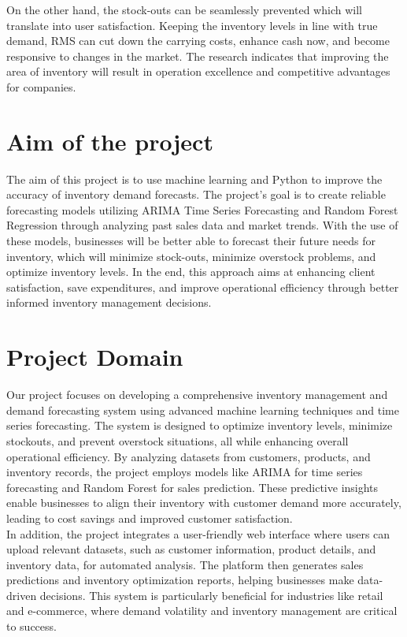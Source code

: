 \documentclass[10pt]{report}
\begin{document}
\begin{center}
\hspace{0.5cm} On the other hand, the stock-outs can be seamlessly prevented which will translate into user satisfaction. Keeping the inventory levels in line with true demand, RMS can cut down the carrying costs, enhance cash now, and become responsive to changes in the market. The research indicates that improving the area of inventory will result in operation excellence and competitive advantages for companies.

\linespread{1.5}
\section{Aim of the project}
\hspace{0.5cm}The aim of this project is to use machine learning and Python to improve the accuracy of inventory demand forecasts. The project's goal is to create reliable forecasting models utilizing ARIMA Time Series Forecasting and Random Forest Regression through analyzing past sales data and market trends. With the use of these models, businesses will be better able to forecast their future needs for inventory, which will minimize stock-outs, minimize overstock problems, and optimize inventory levels. In the end, this approach aims at enhancing client satisfaction, save expenditures, and improve operational efficiency through better informed inventory management decisions.

\section{Project Domain}
\hspace{0.5cm}Our project focuses on developing a comprehensive inventory management and demand forecasting system using advanced machine learning techniques and time series forecasting. The system is designed to optimize inventory levels, minimize stockouts, and prevent overstock situations, all while enhancing overall operational efficiency. By analyzing datasets from customers, products, and inventory records, the project employs models like ARIMA for time series forecasting and Random Forest for sales prediction. These predictive insights enable businesses to align their inventory with customer demand more accurately, leading to cost savings and improved customer satisfaction.\\

\hspace{0.5cm}In addition, the project integrates a user-friendly web interface where users can upload relevant datasets, such as customer information, product details, and inventory data, for automated analysis. The platform then generates sales predictions and inventory optimization reports, helping businesses make data-driven decisions. This system is particularly beneficial for industries like retail and e-commerce, where demand volatility and inventory management are critical to success.

\end{center}
\end{document}
